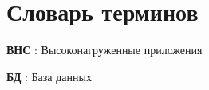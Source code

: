 \chapter*{Словарь терминов}             %

\textbf{ВНС} : Высоконагруженные приложения

\textbf{БД} : База данных
